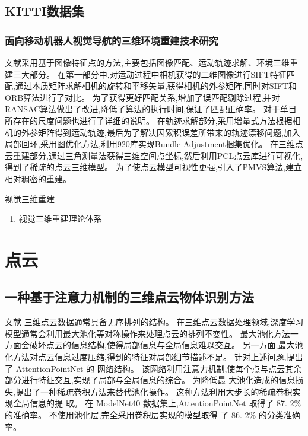 \documentclass{amsart}
\begin{document}
\subsection{KITTI数据集}
\label{sec:03}

\subsubsection{面向移动机器人视觉导航的三维环境重建技术研究}
\label{sec:0301}
文献\cite{黄丽}采用基于图像特征点的方法,主要包括图像匹配、运动轨迹求解、环境三维重建三大部分。
在第一部分中,对运动过程中相机获得的二维图像进行SIFT特征匹配,通过本质矩阵求解相机的旋转和平移矢量,获得相机的外参矩阵,同时对SIFT和ORB算法进行了对比。
为了获得更好匹配关系,增加了误匹配剔除过程,并对RANSAC算法做出了改进,降低了算法的执行时间,保证了匹配正确率。
对于单目所存在的尺度问题也进行了详细的说明。
在轨迹求解部分,采用增量式方法根据相机的外参矩阵得到运动轨迹,最后为了解决因累积误差所带来的轨迹漂移问题,加入局部回环,采用图优化方法,利用920库实现Bundle Adjustment捆集优化。
在三维点云重建部分,通过三角测量法获得三维空间点坐标,然后利用PCL点云库进行可视化,得到了稀疏的点云三维模型。
为了使点云模型可视性更强,引入了PMVS算法,建立相对稠密的重建。

视觉三维重建
\begin{enumerate}
\item 视觉三维重建理论体系
\end{enumerate}


\section{点云}

\subsection{一种基于注意力机制的三维点云物体识别方法}
\label{sec:01}


文献\cite{钟诚}
三维点云数据通常具备无序排列的结构。
在三维点云数据处理领域,深度学习模型通常会利用最大池化等对称操作来处理点云的排列不变性。
最大池化方法一方面会破坏点云的信息结构,使得局部信息与全局信息难以交互。
另一方面,最大池化方法对点云信息过度压缩,得到的特征对局部细节描述不足。 针对上述问题,提出了 AttentionPointNet 的
网络结构。 该网络利用注意力机制,使每个点与点云其余部分进行特征交互,实现了局部与全局信息的综合。 为降低最
大池化造成的信息损失,提出了一种稀疏卷积方法来替代池化操作。 这种方法利用大步长的稀疏卷积实现全局信息的提
取。 在 ModelNet40 数据集上,AttentionPointNet 取得了 87. 2\% 的准确率。 不使用池化层,完全采用卷积层实现的模型取得
了 86. 2\% 的分类准确率。
\end{document}

